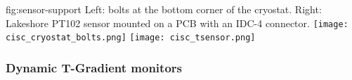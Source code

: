 \begin{dunefigure}{fig:sensor-support}
  {Left: bolts at the bottom corner of the cryostat. Right: Lakeshore PT102 sensor mounted on a PCB with an IDC-4 connector.}
  \texttt{[image: cisc\_cryostat\_bolts.png]}%
    \hspace{1cm}%
  \texttt{[image: cisc\_tsensor.png]}%
\end{dunefigure}






\subsubsection{Dynamic T-Gradient monitors}



